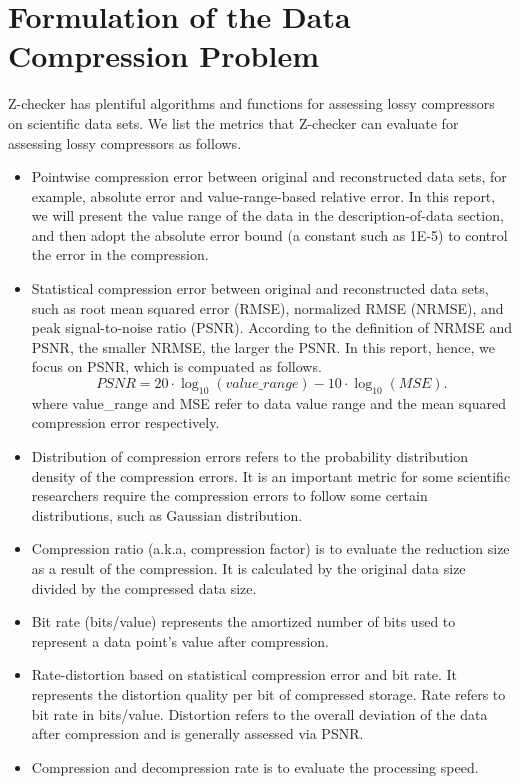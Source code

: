 \section{Formulation of the Data Compression Problem}
Z-checker has plentiful algorithms and functions for assessing lossy compressors on scientific data sets.
We list the metrics that Z-checker can evaluate for assessing lossy compressors as follows.
\begin{itemize}
\item Pointwise compression error between original and reconstructed data sets, for example, absolute error and value-range-based relative error. In this report, we will present the value range of the data in the description-of-data section, and then adopt the absolute error bound (a constant such as 1E-5) to control the error in the compression.
\item Statistical compression error between original and reconstructed data sets, such as root mean squared error (RMSE), normalized RMSE (NRMSE), and peak signal-to-noise ratio (PSNR). According to the definition of NRMSE and PSNR, the smaller NRMSE, the larger the PSNR. In this report, hence, we focus on PSNR, which is compuated as follows.
\begin{equation}
PSNR = 20\cdot \log_{10}{(value\_range)} - 10\cdot \log_{10}{(MSE)}. 
\end{equation}  
where value\_range and MSE refer to data value range and the mean squared compression error respectively.
\item Distribution of compression errors refers to the probability distribution density of the compression errors.
It is an important metric for some scientific researchers require the compression errors to follow some certain distributions, such as Gaussian distribution.
\item Compression ratio (a.k.a, compression factor) is to evaluate the reduction size as a result of the compression. It is calculated by the original data size divided by the compressed data size.
\item Bit rate (bits/value) represents the amortized number of bits used to represent a data point's value after compression.
\item Rate-distortion based on statistical compression error and bit rate. It represents the distortion quality per bit of compressed storage. 
Rate refers to bit rate in bits/value. Distortion refers to the overall deviation of the data after compression and is generally assessed via PSNR.
\item Compression and decompression rate is to evaluate the processing speed.

\end{itemize}
